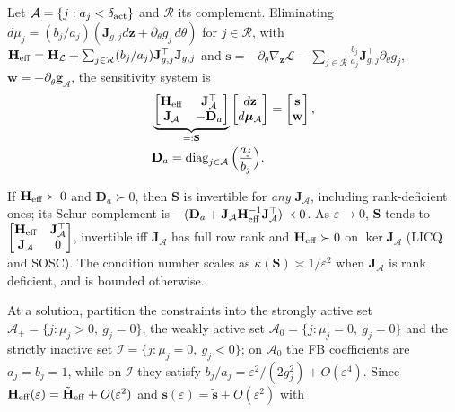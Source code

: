 Let $\mathcal A=\{j:a_j<\delta_{\rm act}\}$ and $\mathcal R$ its complement. Eliminating $d\mu_j=(b_j/a_j)(\mathbf J_{g,j}d\mathbf z+\partial_\theta g_j\,d\theta)$ for $j\in\mathcal R$, with $\mathbf H_{\rm eff}=\mathbf H_{\mathcal L}+\sum_{j\in\mathcal R}(b_j/a_j)\mathbf J_{g,j}^\top\mathbf J_{g,j}$ and
$\mathbf s=-\partial_\theta\nabla_{\mathbf z}\mathcal L-\sum_{j\in\mathcal R}\frac{b_j}{a_j}\mathbf J_{g,j}^\top\partial_\theta g_j$, $\mathbf w=-\partial_\theta\mathbf g_{\mathcal A}$, the sensitivity system is
\begin{equation}
\begin{aligned}
&\underbrace{\begin{bmatrix}\mathbf H_{\rm eff}&\mathbf J_{\mathcal A}^\top\\ \mathbf J_{\mathcal A}&-\mathbf D_a\end{bmatrix}}_{=:\mathbf S}
\begin{bmatrix}d\mathbf z\\ d\boldsymbol\mu_{\mathcal A}\end{bmatrix}
=\begin{bmatrix}\mathbf s\\ \mathbf w\end{bmatrix},\\
&\mathbf D_a=\operatorname{diag}_{j\in\mathcal A}\Big(\frac{a_j}{b_j}\Big).
\end{aligned}
\label{eq:saddle}
\end{equation}
\begin{theorem}\label{thm:fb}
If $\mathbf H_{\rm eff}\succ0$ and $\mathbf D_a\succ0$, then $\mathbf S$ is invertible for \emph{any} $\mathbf J_{\mathcal A}$, including rank-deficient ones; its Schur complement is $-(\mathbf D_a+\mathbf J_{\mathcal A}\mathbf H_{\rm eff}^{-1}\mathbf J_{\mathcal A}^\top)\prec0$. As $\varepsilon\to0$, $\mathbf S$ tends to $\begin{bmatrix}\mathbf H_{\rm eff}&\mathbf J_{\mathcal A}^\top\\ \mathbf J_{\mathcal A}&0\end{bmatrix}$, invertible iff $\mathbf J_{\mathcal A}$ has full row rank and $\mathbf H_{\rm eff}\succ0$ on $\ker\mathbf J_{\mathcal A}$ (LICQ and SOSC). The condition number scales as $\kappa(\mathbf S)\asymp1/\varepsilon^2$ when $\mathbf J_{\mathcal A}$ is rank deficient, and is bounded otherwise.
\end{theorem}
At a solution, partition the constraints into the strongly active set $\mathcal A_+=\{j:\mu_j>0,\ g_j=0\}$, the weakly active set $\mathcal A_0=\{j:\mu_j=0,\ g_j=0\}$ and the strictly inactive set $\mathcal I=\{j:\mu_j=0,\ g_j<0\}$; on $\mathcal A_0$ the FB coefficients are $a_j=b_j=1$, while on $\mathcal I$ they satisfy $b_j/a_j=\varepsilon^2/(2g_j^2)+O(\varepsilon^4)$. Since $\mathbf H_{\rm eff}(\varepsilon)=\tilde{\mathbf H}_{\rm eff}+O(\varepsilon^2)$ and $\mathbf s(\varepsilon)=\tilde{\mathbf s}+O(\varepsilon^2)$ with
